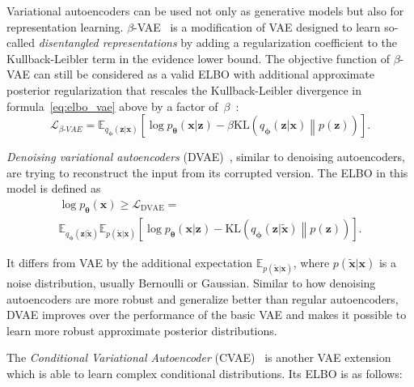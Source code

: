 \documentclass[sigconf,authorversion]{acmart}
\newcommand{\KL}[2]{\mathrm{KL}\left(#1 \middle\| #2\right)}
\def\bz{{\bf z}}
\def\btheta{{\boldsymbol{\theta}}}
\def\bphi{{\boldsymbol{\phi}}}
\def\bz{\boldsymbol{z}}
\def\bx{\boldsymbol{x}}
\begin{document}
Variational autoencoders can be used not only as generative models but also for representation learning. $\beta$-VAE~\cite{higgins2017beta} is a modification of VAE designed to learn so-called \emph{disentangled representations} by adding a regularization coefficient to the Kullback-Leibler term in the evidence lower bound. The objective function of $\beta$-VAE can still be considered as a valid ELBO with additional approximate posterior regularization that rescales the Kullback-Leibler divergence in formula~\eqref{eq:elbo_vae} above by a factor of~$\beta$~\cite{hoffman2017beta,DBLP:conf/icml/MathieuRST19}:
\begin{equation}\label{eq:elbo_bvae}
    \mathcal{L}_{\beta\textrm{-}VAE} =
    \mathbb{E}_{q_{\bphi}(\bz|\bx)}\left[\log p_{\btheta}(\bx|\bz) - \beta\KL{q_{\bphi}(\bz|\bx)}{p(\bz)}\right].
\end{equation}

\emph{Denoising variational autoencoders} (DVAE)~\cite{im2017denoising,shu2018amortized}, similar to denoising autoencoders, are trying to reconstruct the input from its corrupted version. The ELBO in this model is defined as
\begin{multline}\label{eq:elbo_dvae}
    \log p_{\btheta}(\bx) \ge \mathcal{L}_{\mathrm{DVAE}} = \\
    \mathbb{E}_{q_{\bphi}(\bz|\tilde{\bx})}
    \mathbb{E}_{p(\tilde{\bx}|\bx)}\left[
    \log p_{\btheta}(\bx|\bz) - \KL{q_{\bphi}(\bz|\tilde{\bx})}{p(\bz)}\right].
\end{multline}

\noindent
It differs from VAE by the additional expectation $\mathbb{E}_{p(\tilde{\bx}|\bx)}$, where $p(\tilde{\bx}|\bx)$ is a noise distribution, usually Bernoulli or Gaussian. Similar to how denoising autoencoders are more robust and generalize better than regular autoencoders, DVAE improves over the performance of the basic VAE and makes it possible to learn more robust approximate posterior distributions.

The \emph{Conditional Variational Autoencoder} (CVAE)~\cite{sohn2015learning} is another VAE extension which is able to learn complex conditional distributions. Its ELBO is as follows:
\end{document}
